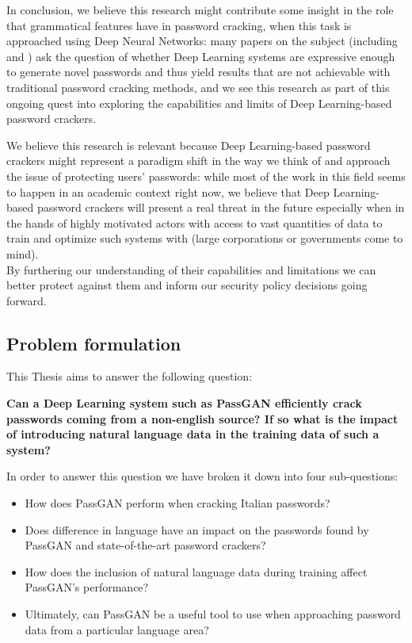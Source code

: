 In conclusion, we believe this research might contribute some insight in the role that grammatical features have in password cracking, when this task is approached using Deep Neural Networks: many papers on the subject (including \cite{PassGAN} and \cite{Melicher2016}) ask the question of whether Deep Learning systems are expressive enough to generate novel passwords and thus yield results that are not achievable with traditional password cracking methods, and we see this research as part of this ongoing quest into exploring the capabilities and limits of Deep Learning-based password crackers.

We believe this research is relevant because Deep Learning-based password crackers might represent a paradigm shift in the way we think of and approach the issue of protecting users' passwords:
while most of the work in this field seems to happen in an academic context right now, we believe that Deep Learning-based password crackers will present a real threat in the future especially when in the hands of highly motivated actors with access to vast quantities of data to train and optimize such systems with (large corporations or governments come to mind).\\ 
By furthering our understanding of their capabilities and limitations we can better protect against them and inform our security policy decisions going forward. 
\subsection{Problem formulation}\label{subsec:problem-formulation}
This Thesis aims to answer the following question:

\textbf{Can a Deep Learning system such as PassGAN efficiently crack passwords coming from a non-english source? If so what is the impact of introducing natural language data in the training data of such a system?}

In order to answer this question we have broken it down into four sub-questions:
\begin{itemize}
\item How does PassGAN perform when cracking Italian passwords? %
\item Does difference in language have an impact on the passwords found by PassGAN and state-of-the-art password crackers?    
\item How does the inclusion of natural language data during training affect PassGAN's performance?
\item Ultimately, can PassGAN be a useful tool to use when approaching password data from a particular language area? %
\end{itemize}



